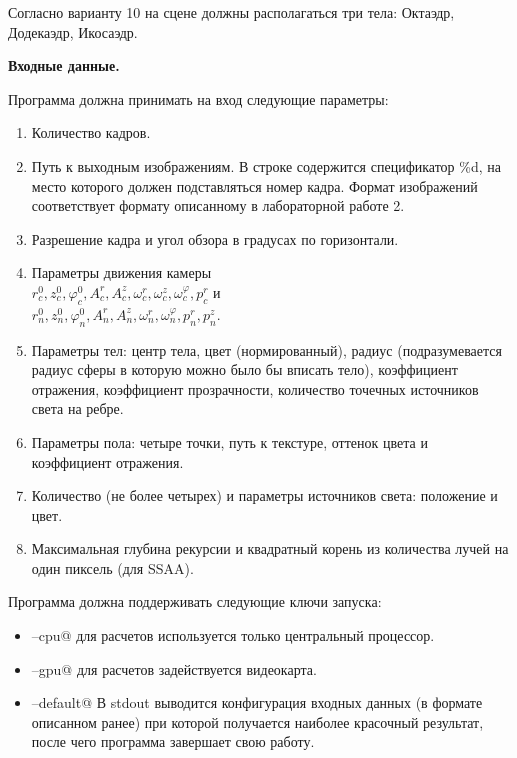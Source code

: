 \documentclass[12pt]{article}
\begin{document}
Согласно варианту 10 на сцене должны располагаться три тела: Октаэдр, Додекаэдр, Икосаэдр.

\textbf{Входные данные.}

Программа должна принимать на вход следующие параметры:

\begin{enumerate}
	\item Количество кадров.

	\item Путь к выходным изображениям. В строке содержится спецификатор \%d, на
	      место которого должен подставляться номер кадра. Формат изображений
	      соответствует формату описанному в лабораторной работе 2.

	\item Разрешение кадра и угол обзора в градусах по горизонтали.

	\item Параметры движения камеры \\
	      $r_c^0, z_c^0, \varphi_c^0, A_c^r, A_c^z, \omega_c^r, \omega_c^z, \omega_c^\varphi, p_c^r$ и \\
	      $r_n^0, z_n^0, \varphi_n^0, A_n^r,A_n^z,\omega_n^r,\omega_n^\varphi, p_n^r, p_n^z$.

	\item Параметры тел:
	      центр тела,
	      цвет (нормированный),
	      радиус (подразумевается радиус сферы в которую можно было бы вписать тело),
	      коэффициент отражения,
	      коэффициент прозрачности,
	      количество точечных источников света на ребре.

	\item Параметры пола: четыре точки, путь к текстуре, оттенок цвета и коэффициент отражения.

	\item Количество (не более четырех) и параметры источников света: положение и цвет.

	\item Максимальная глубина рекурсии и квадратный корень из количества лучей на один пиксель (для SSAA).
\end{enumerate}

\noindent Программа должна поддерживать следующие ключи запуска:

\begin{itemize}
	\item \lstinline@--cpu@ для расчетов используется только центральный процессор.
	\item \lstinline@--gpu@ для расчетов задействуется видеокарта.
	\item \lstinline@--default@
	      В stdout выводится конфигурация входных данных (в формате
	      описанном ранее) при которой получается наиболее красочный результат, после чего
	      программа завершает свою работу.
\end{itemize}
\end{document}
